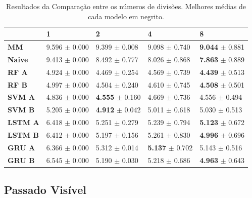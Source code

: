 \begin{table}[htbp]
    \begin{tabular*}{\linewidth}{@{\extracolsep{\fill}}lllll}
    \toprule
     & 
    \multicolumn{1}{l}{\textbf{1}} & 
    \multicolumn{1}{l}{\textbf{2}} &
    \multicolumn{1}{l}{\textbf{4}} &
    \multicolumn{1}{l}{\textbf{8}} \\
    \midrule
    \textbf{MM} & 9.596 $\pm$ 0.000 & 9.399 $\pm$ 0.008 & 9.098 $\pm$ 0.740 & \textbf{9.044} $\pm$ 0.881
    \\
    \midrule
    \textbf{Naive} & 9.413 $\pm$ 0.000 & 8.492 $\pm$ 0.777 & 8.026 $\pm$ 0.868 & \textbf{7.863} $\pm$ 0.889
    \\
    \midrule
    \textbf{RF A} & 4.924 $\pm$ 0.000 & 4.469 $\pm$ 0.254 & 4.569 $\pm$ 0.739 & \textbf{4.439} $\pm$ 0.513
    \\
    \midrule
    \textbf{RF B} & 4.997 $\pm$ 0.000 & 4.504 $\pm$ 0.240 & 4.610 $\pm$ 0.745 & \textbf{4.508} $\pm$ 0.501
    \\
    \midrule
    \textbf{SVM A} & 4.836 $\pm$ 0.000 & \textbf{4.555} $\pm$ 0.160 & 4.669 $\pm$ 0.736 & 4.556 $\pm$ 0.494
    \\
    \midrule
    \textbf{SVM B} & 5.205 $\pm$ 0.000 & \textbf{4.912} $\pm$ 0.042 & 5.011 $\pm$ 0.618 & 5.030 $\pm$ 0.513
    \\
    \midrule
    \textbf{LSTM A} & 6.418 $\pm$ 0.000 & 5.251 $\pm$ 0.279 & 5.239 $\pm$ 0.794 & \textbf{5.123} $\pm$ 0.672
    \\
    \midrule
    \textbf{LSTM B} & 6.412 $\pm$ 0.000 & 5.197 $\pm$ 0.156 & 5.261 $\pm$ 0.830 & \textbf{4.996} $\pm$ 0.696
    \\
    \midrule
    \textbf{GRU A} & 6.366 $\pm$ 0.000 & 5.312 $\pm$ 0.014 & \textbf{5.137} $\pm$ 0.702 & 5.143 $\pm$ 0.516
    \\
    \midrule
    \textbf{GRU B} & 6.545 $\pm$ 0.000 & 5.190 $\pm$ 0.030 & 5.218 $\pm$ 0.686 & \textbf{4.963} $\pm$ 0.643
    \\
    \bottomrule
    \end{tabular*}
    \label{table:res_split}
    \caption{Resultados da Comparação entre os números de divisões. Melhores médias de cada modelo em negrito.}
\end{table}

\subsection{Passado Visível}


